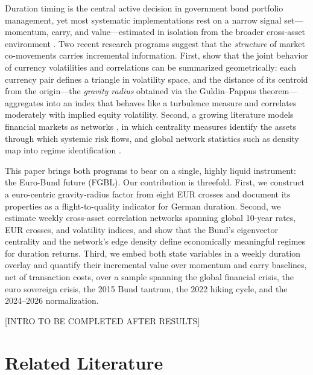 \documentclass[12pt]{article}
\begin{document}
Duration timing is the central active decision in government bond portfolio management, yet most systematic implementations rest on a narrow signal set---momentum, carry, and value---estimated in isolation from the broader cross-asset environment \citep{konstantinov2023qgbpm}. Two recent research programs suggest that the \emph{structure} of market co-movements carries incremental information. First, \citet{konstantinov2022geometry} show that the joint behavior of currency volatilities and correlations can be summarized geometrically: each currency pair defines a triangle in volatility space, and the distance of its centroid from the origin---the \emph{gravity radius} obtained via the Guldin--Pappus theorem---aggregates into an index that behaves like a turbulence measure and correlates moderately with implied equity volatility. Second, a growing literature models financial markets as networks \citep{diebold2015connectedness, konstantinov2023networks, konstantinov2025networkmodels}, in which centrality measures identify the assets through which systemic risk flows, and global network statistics such as density map into regime identification \citep{konstantinov2025unsupervised, konstantinov2020network}.

This paper brings both programs to bear on a single, highly liquid instrument: the Euro-Bund future (FGBL). Our contribution is threefold. First, we construct a euro-centric gravity-radius factor from eight EUR crosses and document its properties as a flight-to-quality indicator for German duration. Second, we estimate weekly cross-asset correlation networks spanning global 10-year rates, EUR crosses, and volatility indices, and show that the Bund's eigenvector centrality and the network's edge density define economically meaningful regimes for duration returns. Third, we embed both state variables in a weekly duration overlay and quantify their incremental value over momentum and carry baselines, net of transaction costs, over a sample spanning the global financial crisis, the euro sovereign crisis, the 2015 Bund tantrum, the 2022 hiking cycle, and the 2024--2026 normalization.

[INTRO TO BE COMPLETED AFTER RESULTS]

\section{Related Literature}\label{sec:lit}
\end{document}
